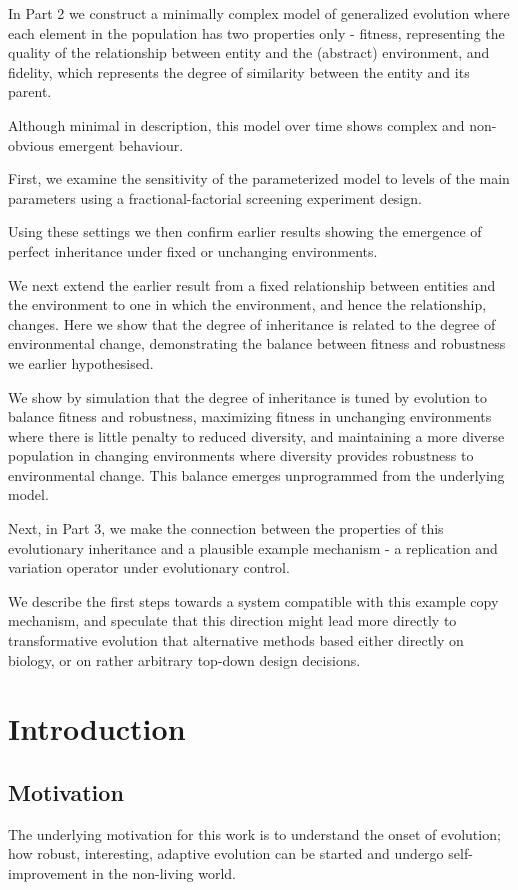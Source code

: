 \documentclass[]{report}
\begin{document}
In Part 2 we construct a minimally complex model of generalized evolution where each element in the population has two properties only - fitness, representing the quality of the relationship between entity and the (abstract) environment, and fidelity, which represents the degree of similarity between the entity and its parent.

Although minimal in description, this model over time shows complex and non-obvious emergent behaviour.

First, we examine the sensitivity of the parameterized model to levels of the main parameters using a fractional-factorial screening experiment design.

Using these settings we then confirm earlier results showing the emergence of perfect inheritance under fixed or unchanging environments.

We next extend the earlier result from a fixed relationship between entities and the environment to one in which the environment, and hence the relationship, changes. Here we show that the degree of inheritance is related to the degree of environmental change, demonstrating the balance between fitness and robustness we earlier hypothesised.

We show by simulation that the degree of inheritance is tuned by evolution to balance fitness and robustness, maximizing fitness in unchanging environments where there is little penalty to reduced diversity, and maintaining a more diverse population in changing environments where diversity provides robustness to environmental change. This balance emerges unprogrammed from the underlying model.

Next, in Part 3, we make the connection between the properties of this evolutionary inheritance and a plausible example mechanism  - a replication and variation operator under evolutionary control.

We describe the first steps towards a system compatible with this example copy mechanism, and speculate that this direction might lead more directly to transformative evolution that alternative methods based either directly on biology, or on rather arbitrary top-down design decisions.

\chapter{Introduction}

\section{Motivation}
The underlying motivation for this work is to understand the onset of evolution; how robust, interesting, adaptive evolution can be started and undergo self-improvement in the non-living world.
\end{document}
